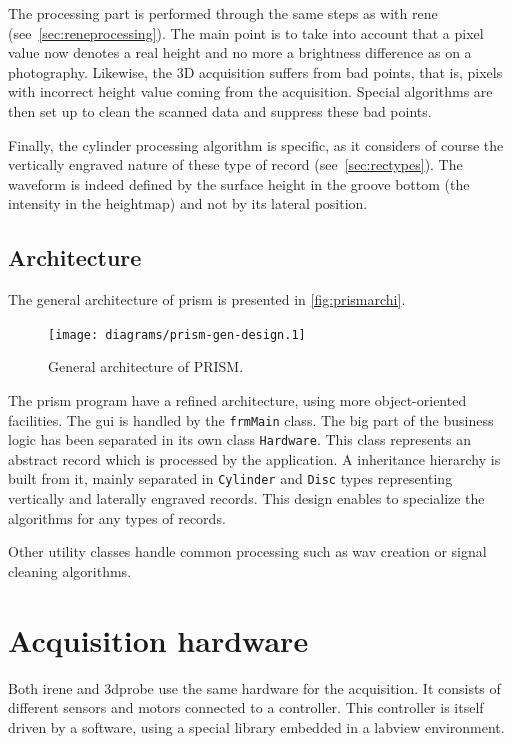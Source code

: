 The processing part is performed through the same steps as with \gls{rene} (see~\autoref{sec:reneprocessing}). The main point is to take into account that a pixel value now denotes a real height and no more a brightness difference as on a photography. Likewise, the 3D acquisition suffers from bad points, that is, pixels with incorrect height value coming from the acquisition. Special algorithms are then set up to clean the scanned data and suppress these bad points.

Finally, the cylinder processing algorithm is specific, as it considers of course the vertically engraved nature of these type of record (see~\autoref{sec:rectypes}). The waveform is indeed defined by the surface height in the groove bottom (the intensity in the heightmap) and not by its lateral position.

\subsection{Architecture}
\label{sec:prismarchi}

The general architecture of \gls{prism} is presented in \autoref{fig:prismarchi}.

\begin{figure}[!ht]
\centering
\texttt{[image: diagrams/prism-gen-design.1]}
\caption{General architecture of PRISM.}
\label{fig:prismarchi}
\end{figure}

The \gls{prism} program have a refined architecture, using more object-oriented facilities. The \gls{gui} is handled by the \texttt{frmMain} class. The big part of the business logic has been separated in its own class \texttt{Hardware}. This class represents an abstract record which is processed by the application. A inheritance hierarchy is built from it, mainly separated in \texttt{Cylinder} and \texttt{Disc} types representing vertically and laterally engraved records. This design enables to specialize the algorithms for any types of records.

Other utility classes handle common processing such as \gls{wav} creation or signal cleaning algorithms.

\section{Acquisition hardware}

Both \gls{irene} and \gls{3dprobe} use the same hardware for the acquisition. It consists of different sensors and motors connected to a controller. This controller is itself driven by a software, using a special library embedded in a \gls{labview} environment.

